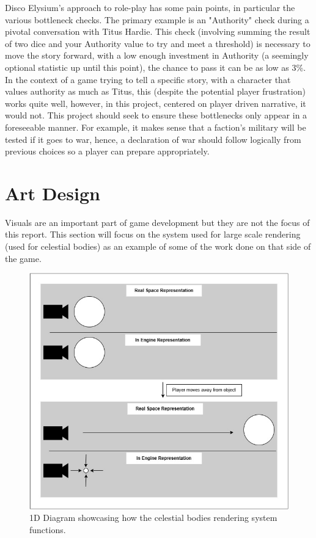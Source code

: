 \documentclass{report}
\begin{document}
Disco Elysium's approach to role-play has some pain points, in particular the various bottleneck checks. The primary example is an "Authority" check during a pivotal conversation with Titus Hardie. This check (involving summing the result of two dice and your Authority value to try and meet a threshold) is necessary to move the story forward, with a low enough investment in Authority (a seemingly optional statistic up until this point), the chance to pass it can be as low as 3\%. In the context of a game trying to tell a specific story, with a character that values authority as much as Titus, this (despite the potential player frustration) works quite well, however, in this project, centered on player driven narrative, it would not. This project should seek to ensure these bottlenecks only appear in a foreseeable manner. For example, it makes sense that a faction's military will be tested if it goes to war, hence, a declaration of war should follow logically from previous choices so a player can prepare appropriately.

\section{Art Design}

Visuals are an important part of game development but they are not the focus of this report. This section will focus on the system used for large scale rendering (used for celestial bodies) as an example of some of the work done on that side of the game. 

\begin{figure}[H]
    \includegraphics[width=\textwidth]{celestialbodiesSystemDiagram.jpg}
    \caption{1D Diagram showcasing how the celestial bodies rendering system functions.}
\end{figure}
\end{document}
